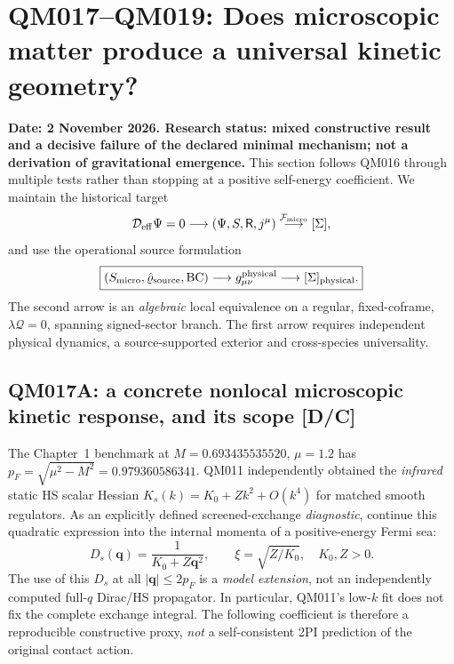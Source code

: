 \documentclass[11pt,a4paper]{article}
\begin{document}
\newpage
\section{QM017--QM019: Does microscopic matter produce a universal kinetic geometry?}\label{sec:v11-qm017-019}
\noindent\textbf{Date: 2 November 2026. Research status: mixed constructive result and a decisive failure of the declared minimal mechanism; not a derivation of gravitational emergence.} This section follows QM016 through multiple tests rather than stopping at a positive self-energy coefficient. We maintain the historical target
\begin{equation}\label{eq:v11-original}
\mathcal D_{\rm eff}\Psi=0\longrightarrow(\Psi,S,\mathsf R,j^\mu)
\overset{\mathcal F_{\rm micro}}{\longrightarrow}[\Sigma],
\end{equation}
and use the operational source formulation
\begin{equation}\label{eq:v11-operational}
\boxed{(S_{\rm micro},\hat\varrho_{\rm source},{\rm BC})
\longrightarrow g_{\mu\nu}^{\rm physical}\longrightarrow[\Sigma]_{\rm physical}.}
\end{equation}
The second arrow is an \emph{algebraic} local equivalence on a regular, fixed-coframe, $\lambda\mathcal Q=0$, spanning signed-sector branch. The first arrow requires independent physical dynamics, a source-supported exterior and cross-species universality.

\subsection{QM017A: a concrete nonlocal microscopic kinetic response, and its scope [D/C]}\label{sec:v11-exchange}
The Chapter~1 benchmark at $M=0.693435535520$, $\mu=1.2$ has $p_F=\sqrt{\mu^2-M^2}=0.979360586341$. QM011 independently obtained the \emph{infrared} static HS scalar Hessian $K_s(k)=K_0+Zk^2+O(k^4)$ for matched smooth regulators. As an explicitly defined screened-exchange \emph{diagnostic}, continue this quadratic expression into the internal momenta of a positive-energy Fermi sea:
\begin{equation}\label{eq:v11-screen}
 D_s(\bm q)=\frac1{K_0+Z\bm q^2},\qquad
 \xi=\sqrt{Z/K_0},\quad K_0,Z>0.
\end{equation}
The use of this $D_s$ at all $|\bm q|\le2p_F$ is a \emph{model extension}, not an independently computed full-$q$ Dirac/HS propagator. In particular, QM011's low-$k$ fit does not fix the complete exchange integral. The following coefficient is therefore a reproducible constructive proxy, \emph{not} a self-consistent 2PI prediction of the original contact action.
\end{document}
